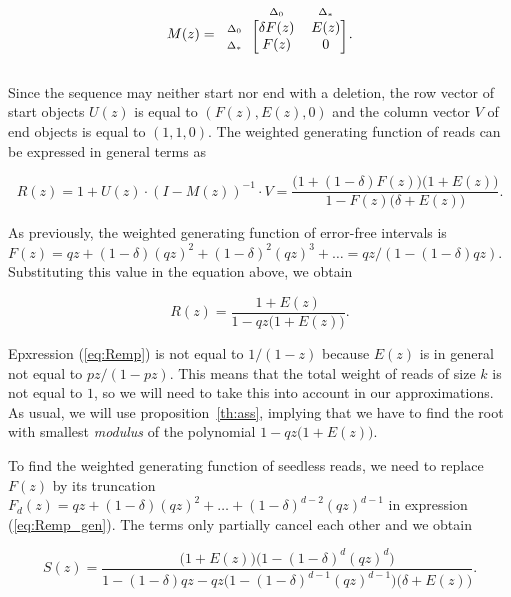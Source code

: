 \documentclass{article}
\newcommand{\smDELz}{\scriptstyle{\Delta_0}}
\newcommand{\smDELs}{\scriptstyle{\Delta_*}}
\begin{document}
\begin{equation*}
M(z) = 
\begin{blockarray}{ccc}
       & \smDELz & \smDELs \\
\begin{block}{c[cc]}
\smDELz & \delta F(z)  & E(z) \\
\smDELs & F(z)         & 0    \\
\end{block}
\end{blockarray}.
\end{equation*}

Since the sequence may neither start nor end with a deletion, the row
vector of start objects $U(z)$ is equal to $(F(z), E(z), 0)$ and the
column vector $V$ of end objects is equal to $(1,1,0)$. The weighted
generating function of reads can be expressed in general terms as

\begin{equation}
\label{eq:Remp_gen}
R(z) = 1 + U(z) \cdot (I-M(z))^{-1} \cdot V =
\frac{\big(1+(1-\delta)F(z)\big)\big(1+E(z)\big)}
   {1-F(z)\big(\delta+E(z)\big)}.
\end{equation}

As previously, the weighted generating function of error-free intervals is
$F(z) = qz + (1-\delta)(qz)^2 + (1-\delta)^2(qz)^3 + \ldots =
qz/(1-(1-\delta)qz)$. Substituting this value in the equation above, we
obtain

\begin{equation}
\label{eq:Remp}
R(z) = \frac{1+E(z)}{1-qz\big(1+E(z)\big)}.
\end{equation}

Epxression (\ref{eq:Remp}) is not equal to $1/(1-z)$ because $E(z)$ is in
general not equal to $pz/(1-pz)$. This means that the total weight of
reads of size $k$ is not equal to $1$, so we will need to take this
into account in our approximations. As usual, we will use
proposition~\ref{th:ass}, implying that we have to find the root with
smallest \textit{modulus} of the polynomial $1-qz\big(1+E(z)\big)$.

To find the weighted generating function of seedless reads, we need to
replace $F(z)$ by its truncation $F_d(z) = qz + (1-\delta)(qz)^2 + \ldots
+ (1-\delta)^{d-2}(qz)^{d-1}$ in expression (\ref{eq:Remp_gen}). The terms
only partially cancel each other and we obtain

\begin{equation}
\label{eq:Semp}
S(z) = \frac{\big(1+E(z)\big)\big( 1-(1-\delta)^d(qz)^d \big)}
{1-(1-\delta)qz-qz\big(1-(1-\delta)^{d-1}(qz)^{d-1}\big)
\big(\delta+E(z)\big) }.
\end{equation}
\end{document}
